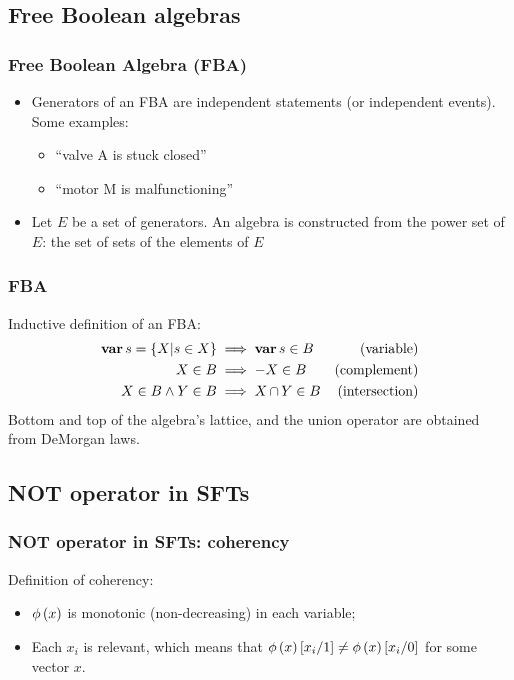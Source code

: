 \documentclass{beamer}
\def\FBA{%
	Free Boolean Algebra (FBA)%
	\gdef\FBA{FBA\xspace}%
	\gdef\FBAs{FBAs\xspace}%
	\gdef\iFBA{an FBA\xspace}%
	\xspace%
}
\def\FBAs{%
	Free Boolean Algebras (FBAs)%
	\gdef\FBA{FBA\xspace}%
	\gdef\FBAs{FBAs\xspace}%
	\gdef\iFBA{an FBA\xspace}%
	\xspace%
}
\def\iFBA{%
	a Free Boolean Algebra (FBA)%
	\gdef\FBA{FBA\xspace}%
	\gdef\FBAs{FBAs\xspace}%
	\gdef\iFBA{an FBA\xspace}%
	\xspace%
}
\def\varop{\ensuremath\operatorname{\mathbf{var}}}
\newcommand{\var}[1]{\ensuremath\varop #1}
\def\inter{\ensuremath\operatorname{\cap}}
\def\ftcoherencyop{\ensuremath\operatorname{\phi}}
\newcommand{\ftcoherency}[1]{\ensuremath\ftcoherencyop\left(#1\right)}
\newcommand{\replace}[2]{\ensuremath\left[#1\middle/#2\right]}
\begin{document}
\subsection{Free Boolean algebras}

\begin{frame}
	\frametitle{\FBA}
	\begin{itemize}
		\item Generators of \iFBA are independent statements (or independent events). Some examples:
		\begin{itemize}
			\item ``valve A is stuck closed''
			\item ``motor M is malfunctioning''
		\end{itemize}
		\item Let $E$ be a set of generators. An algebra is constructed from the power set of $E$: the set of sets of the elements of $E$
	\end{itemize}
\end{frame}

\begin{frame}[fragile]
	\frametitle{\FBA}
	Inductive definition of \iFBA:
	\begin{subequations}
		\begin{align}
		\var s = \{X | s \in X\} & \implies \var s \in B & \text{(variable)}\\
		X \in B & \implies -X \in B                           & \text{(complement)}\\
		X \in B \land Y \in B & \implies X \inter Y \in B     & \text{(intersection)}
		\end{align}
	\end{subequations}
	Bottom and top of the algebra's lattice, and the union operator are obtained from DeMorgan laws.
\end{frame}

\subsection{NOT operator in SFTs}

\begin{frame}
	\frametitle{NOT operator in SFTs: coherency}
	Definition of coherency:
	\begin{itemize}
		\item $\ftcoherency{x}$ is monotonic (non-decreasing) in each variable;
		\item Each $x_i$ is relevant, which means that $\ftcoherency{x}\replace{x_i}{1} \neq \ftcoherency{x}\replace{x_i}{0}$ for some vector $x$.
	\end{itemize}
\end{frame}
\end{document}
